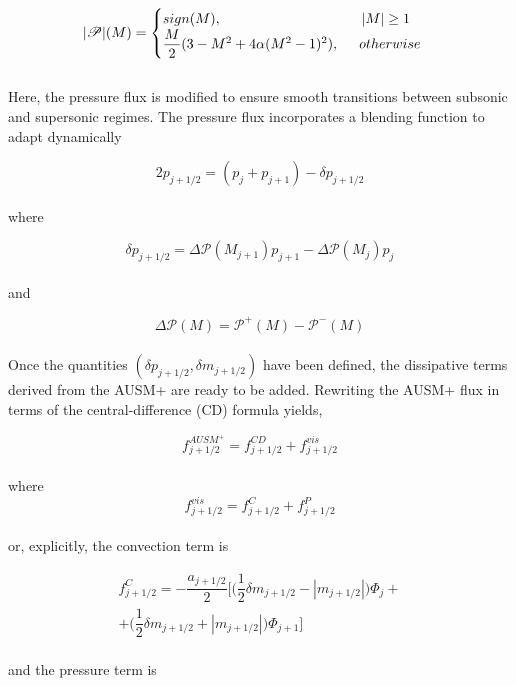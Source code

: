 \documentclass[a5paper]{sapthesis}
\begin{document}
	\begin{equation}
		|\mathscr{P}|(M) = 
		\begin{cases}
			sign(M), \qquad \qquad \qquad \qquad \qquad |M|\geq1\\
			\dfrac{M}{2}(3-M^2+4\alpha(M^2-1)^2), \hspace{5mm}   otherwise
		\end{cases}
	\end{equation}
	\\
	Here, the pressure flux is modified to ensure smooth transitions between subsonic and supersonic regimes. The pressure flux incorporates a blending function to adapt dynamically
	
	\begin{equation}
		2p_{j+1/2} = (p_j +p_{j+1})-\delta p_{j+1/2}
	\end{equation}
	\\
	where
	
	\begin{equation}
		\delta p_{j+1/2} = \Delta \mathscr{P}(M_{j+1})p_{j+1} - \Delta \mathscr{P} (M_{j})p_j 
	\end{equation}
	\\
	and
	
	\begin{equation}
		\Delta \mathscr{P}(M) = \mathscr{P}^+(M) - \mathscr{P}^-(M) 
	\end{equation}
	\\
	Once the quantities $(\delta p_{j+1/2},\delta m_{j+1/2})$ have been defined, the dissipative terms derived from the AUSM+ are ready to be added. Rewriting the AUSM+ flux in terms of the central-difference (CD) formula yields,
	
	\begin{equation}
		f_{j+1/2}^{AUSM^+} = f_{j+1/2}^{CD} + f_{j+1/2}^{vis} 
	\end{equation}
	\\
	where 
	\begin{equation}
		f_{j+1/2}^{vis} = f_{j+1/2}^C +f_{j+1/2}^P
	\end{equation}
	\\
	or, explicitly, the convection term is
	
	\begin{equation}
		\begin{aligned}
			f_{j+1/2}^C = - \dfrac{a_{j+1/2}}{2} \Big[\Big(\dfrac{1}{2}\delta m_{j+1/2}-|m_{j+1/2}|\Big)\Phi_j + \\
			+\Big(\dfrac{1}{2}\delta m_{j+1/2}+|m_{j+1/2}|\Big)\Phi_{j+1}\Big]
		\end{aligned}
	\end{equation}
	\\
	and the pressure term is
	
\end{document}
